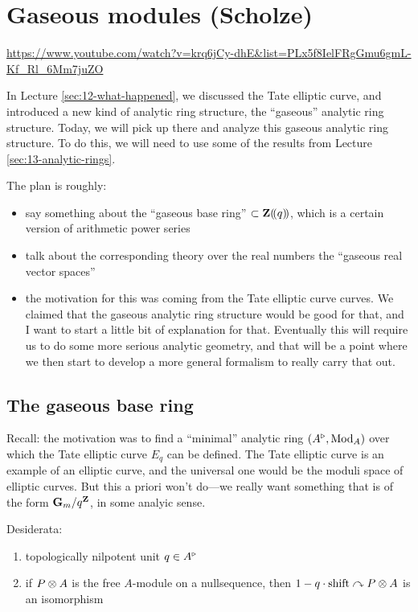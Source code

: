 
\section{\ufs Gaseous modules (Scholze)}
\label{sec:14-gaseous}

\url{https://www.youtube.com/watch?v=krq6jCy-dhE&list=PLx5f8IelFRgGmu6gmL-Kf_Rl_6Mm7juZO}
\renewcommand{\yt}[2]{\href{https://www.youtube.com/watch?v=krq6jCy-dhE&list=PLx5f8IelFRgGmu6gmL-Kf_Rl_6Mm7juZO&t=#1}{#2}}
\vspace{1em}

In Lecture \ref{sec:12-what-happened}, we discussed the Tate elliptic curve, and introduced a new kind of analytic ring structure, the ``gaseous'' analytic ring structure. Today, we will pick up there and analyze this gaseous analytic ring structure. To do this, we will need to use some of the results from Lecture \ref{sec:13-analytic-rings}.

The plan is roughly:
\begin{itemize}
  \item say something about the ``gaseous base ring'' $\subset\mathbf Z(\!(q)\!)$, which is a certain version of arithmetic power series
  \item talk about the corresponding theory over the real numbers the ``gaseous real vector spaces''
  \item the motivation for this was coming from the Tate elliptic curve curves. We claimed that the gaseous analytic ring structure would be good for that, and I want to start a little bit of explanation for that. Eventually this will require us to do some more serious analytic geometry, and that will be a point where we then start to develop a more general formalism to really carry that out.
\end{itemize}


\subsection{\ufs The gaseous base ring}
Recall: the motivation was to find a ``minimal'' analytic ring $(A^\triangleright,\operatorname{Mod}_A)$ over which the Tate elliptic curve $E_q$ can be defined. The Tate elliptic curve is an example of an elliptic curve, and the universal one would be the moduli space of elliptic curves. But this a priori won't do---we really want something that is of the form $\mathbf G_m/q^\mathbf Z$, in some analyic sense.

Desiderata:
\begin{enumerate}
  \item topologically nilpotent unit $q\in A^\triangleright$
  \item if $P\otimes A$ is the free $A$-module on a nullsequence, then $1-q\cdot\mathrm{shift}\curvearrowright P\otimes A$ is an isomorphism
\end{enumerate}

